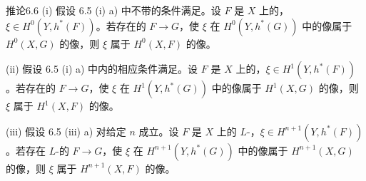 \begin{SGAresult}{推论}{6.6}
(i) 假设 6.5 (i) a) 中不带的条件满足。设 $F$ 是 $X$ 上的，$\xi\in H^0(Y,h^*(F))$。若存在的 $F\to G$，使 $\xi$ 在 $H^0(Y,h^*(G))$ 中的像属于 $H^0(X,G)$ 的像，则 $\xi$ 属于 $H^0(X,F)$ 的像。

(ii) 假设 6.5 (i) a) 中内的相应条件满足。设 $F$ 是 $X$ 上的，$\xi\in H^1(Y,h^*(F))$。若存在的 $F\to G$，使 $\xi$ 在 $H^1(Y,h^*(G))$ 中的像属于 $H^1(X,G)$ 的像，则 $\xi$ 属于 $H^1(X,F)$ 的像。

(iii) 假设 6.5 (iii) a) 对给定 $n$ 成立。设 $F$ 是 $X$ 上的 $L$-，$\xi\in H^{n+1}(Y,h^*(F))$。若存在 $L$-的 $F\to G$，使 $\xi$ 在 $H^{n+1}(Y,h^*(G))$ 中的像属于 $H^{n+1}(X,G)$ 的像，则 $\xi$ 属于 $H^{n+1}(X,F)$ 的像。
\end{SGAresult}

